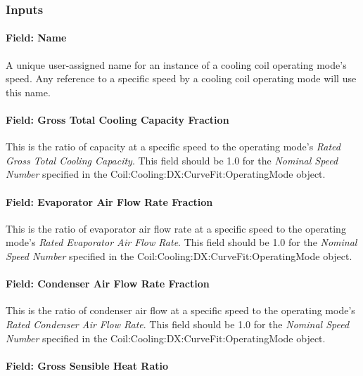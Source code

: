 \subsubsection{Inputs}\label{inputs-04}

\paragraph{Field: Name}\label{field-name-04}

A unique user-assigned name for an instance of a cooling coil operating mode's speed. Any reference to a specific speed by a cooling coil operating mode will use this name.

\paragraph{Field: Gross Total Cooling Capacity Fraction}\label{field-gross-total-cooling-capacity-fraction}

This is the ratio of capacity at a specific speed to the operating mode's \textit{Rated Gross Total Cooling Capacity}. This field should be 1.0 for the \textit{Nominal Speed Number} specified in the Coil:Cooling:DX:CurveFit:OperatingMode object.

\paragraph{Field: Evaporator Air Flow Rate Fraction}\label{field-evaporator-air-flow-rate-fraction}

This is the ratio of evaporator air flow rate at a specific speed to the operating mode's \textit{Rated Evaporator Air Flow Rate}. This field should be 1.0 for the \textit{Nominal Speed Number} specified in the Coil:Cooling:DX:CurveFit:OperatingMode object.

\paragraph{Field: Condenser Air Flow Rate Fraction}\label{field-condenser-air-flow-rate-fraction}

This is the ratio of condenser air flow at a specific speed to the operating mode's \textit{Rated Condenser Air Flow Rate}. This field should be 1.0 for the \textit{Nominal Speed Number} specified in the Coil:Cooling:DX:CurveFit:OperatingMode object.

\paragraph{Field: Gross Sensible Heat Ratio}\label{field-gross-sensible-heat-ratio}

